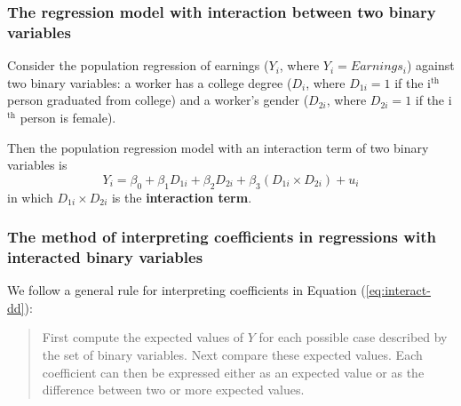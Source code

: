 \documentclass[a4paper,11pt]{article}
\begin{document}
\subsubsection*{The regression model with interaction between two binary variables}
\label{sec:org90f094b}

Consider the population regression of earnings (\(Y_i\), where \(Y_i =
Earnings_i\)) against two binary variables: a worker has a college
degree (\(D_i\), where \(D_{1i} = 1\) if the i\(^{\text{th}}\) person graduated from
college) and a worker's gender (\(D_{2i}\), where \(D_{2i} = 1\) if the
i\(^{\text{th}}\) person is female).

Then the population regression model with an interaction term of
two binary variables is
\begin{equation}
\label{eq:interact-dd}
Y_i = \beta_0 + \beta_1 D_{1i} + \beta_2 D_{2i} + \beta_3 (D_{1i} \times D_{2i}) + u_i
\end{equation}
in which \(D_{1i} \times D_{2i}\) is the \textbf{interaction term}.

\subsubsection*{The method of interpreting coefficients in regressions with interacted binary variables}
\label{sec:org2338fa1}
We follow a general rule for interpreting coefficients in Equation
(\ref{eq:interact-dd}):
\begin{quote}
First compute the expected values of \(Y\) for each possible case
described by the set of binary variables. Next compare these expected
values. Each coefficient can then be expressed either as an expected
value or as the difference between two or more expected values.
\end{quote}
\end{document}
